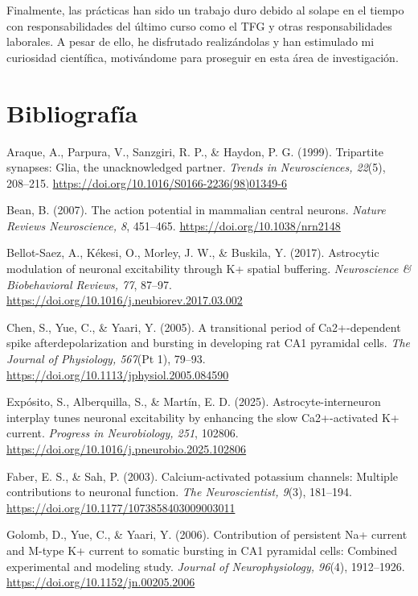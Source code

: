 \documentclass[12pt,a4paper]{report}
\begin{document}
Finalmente, las prácticas han sido un trabajo duro debido al solape en el tiempo con responsabilidades del último curso como el TFG y otras responsabilidades laborales. A pesar de ello, he disfrutado realizándolas y han estimulado mi curiosidad científica, motivándome para proseguir en esta área de investigación.


\chapter{Bibliografía}
Araque, A., Parpura, V., Sanzgiri, R. P., \& Haydon, P. G. (1999). Tripartite synapses: Glia, the unacknowledged partner. \textit{Trends in Neurosciences, 22}(5), 208--215. \url{https://doi.org/10.1016/S0166-2236(98)01349-6}

Bean, B. (2007). The action potential in mammalian central neurons. \textit{Nature Reviews Neuroscience, 8}, 451--465. \url{https://doi.org/10.1038/nrn2148}

Bellot-Saez, A., Kékesi, O., Morley, J. W., \& Buskila, Y. (2017). Astrocytic modulation of neuronal excitability through K+ spatial buffering. \textit{Neuroscience \& Biobehavioral Reviews, 77}, 87--97. \url{https://doi.org/10.1016/j.neubiorev.2017.03.002}

Chen, S., Yue, C., \& Yaari, Y. (2005). A transitional period of Ca2+-dependent spike afterdepolarization and bursting in developing rat CA1 pyramidal cells. \textit{The Journal of Physiology, 567}(Pt 1), 79--93. \url{https://doi.org/10.1113/jphysiol.2005.084590}

Expósito, S., Alberquilla, S., \& Martín, E. D. (2025). Astrocyte-interneuron interplay tunes neuronal excitability by enhancing the slow Ca2+-activated K+ current. \textit{Progress in Neurobiology, 251}, 102806. \url{https://doi.org/10.1016/j.pneurobio.2025.102806}

Faber, E. S., \& Sah, P. (2003). Calcium-activated potassium channels: Multiple contributions to neuronal function. \textit{The Neuroscientist, 9}(3), 181--194. \url{https://doi.org/10.1177/1073858403009003011}

Golomb, D., Yue, C., \& Yaari, Y. (2006). Contribution of persistent Na+ current and M-type K+ current to somatic bursting in CA1 pyramidal cells: Combined experimental and modeling study. \textit{Journal of Neurophysiology, 96}(4), 1912--1926. \url{https://doi.org/10.1152/jn.00205.2006}
\end{document}
